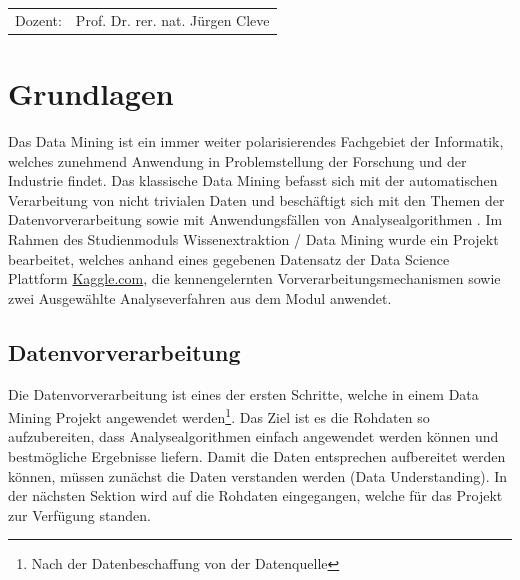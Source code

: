 \documentclass[12pt,					%
							 oneside,			%
							 a4paper,			%
							 halfparskip,		%
							 liststotoc,			%
							 bibtotoc,			%
							 fleqn,				%
							 pointlessnumbers]	%
							 {scrreprt}
\newcommand{\Betreuer}{Prof. Dr. rer. nat. Jürgen Cleve}
\newcommand{\blankpage}{
	\newpage
}
\begin{document}
\begin{titlepage}
\begin{center}
\begin{table}[b]
\begin{tabular}{rl}
					Dozent: & \Betreuer \\

				\end{tabular}
			\end{table}
		\end{center}
	\end{titlepage}

	\onehalfspacing 					%
	

	
\newpage

\tableofcontents 					%
	
\chapter{Grundlagen}

Das Data Mining ist ein immer weiter polarisierendes Fachgebiet der Informatik, welches zunehmend Anwendung in Problemstellung der Forschung und der Industrie findet. Das klassische Data Mining befasst sich mit der automatischen Verarbeitung von nicht trivialen Daten und beschäftigt sich mit den Themen der Datenvorverarbeitung sowie mit Anwendungsfällen von Analysealgorithmen \cite{Cleve2020}. Im Rahmen des Studienmoduls \glqq{}Wissenextraktion / Data Mining\grqq{} wurde ein Projekt bearbeitet, welches anhand eines gegebenen Datensatz der Data Science Plattform \href{www.kaggle.com}{Kaggle.com}, die kennengelernten Vorverarbeitungsmechanismen sowie zwei Ausgewählte Analyseverfahren aus dem Modul anwendet. 

	\section{Datenvorverarbeitung}
	Die Datenvorverarbeitung ist eines der ersten Schritte, welche in einem Data Mining Projekt angewendet werden\footnote{Nach der Datenbeschaffung von der Datenquelle}. Das Ziel ist es die Rohdaten so aufzubereiten, dass Analysealgorithmen einfach angewendet werden können und bestmögliche Ergebnisse liefern.
	Damit die Daten entsprechen aufbereitet werden können, müssen zunächst die Daten verstanden werden (Data Understanding). In der nächsten Sektion wird auf die Rohdaten eingegangen, welche für das Projekt zur Verfügung standen.
	\newpage
\end{document}
